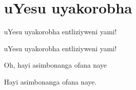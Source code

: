 \starttocol
\chapter{uYesu uyakorobha}
\nexttocol
\hfill{\it }
\stoptocol
\starttocol
\startlines
{\sc uYesu} uyakorobha entliziyweni yami!

uYesu uyakorobha entliziyweni yami!

Oh, hayi asimbonanga ofana naye

Hayi asimbonanga ofana naye.
\stoplines
\nexttocol

\stoptocol
